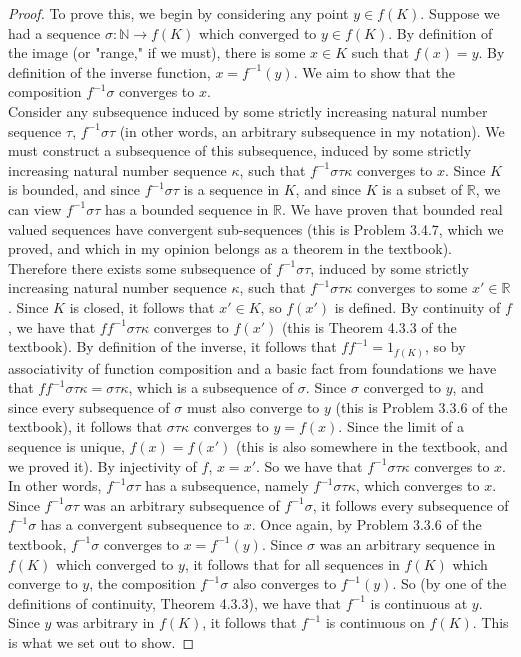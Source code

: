 \documentclass[11pt]{article}
\newcommand{\R}{\mathbb{R}}
\newcommand{\N}{\mathbb{N}}
\newcommand{\inv}[1]{{#1}^{-1}}
\theoremstyle{definition}
\begin{document}
\begin{proof}
To prove this, we begin by considering any point $y\in f(K)$. Suppose we had a sequence $\sigma:\N\to f(K)$ which converged to $y\in f(K)$. By definition of the image (or "range," if we must), there is some $x\in K$ such that $f(x) = y$. By definition of the inverse function, $x = \inv{f}(y)$. We aim to show that the composition $\inv{f}\sigma$ converges to $x$. \\

Consider any subsequence induced by some strictly increasing natural number sequence $\tau$, $\inv{f}\sigma\tau$ (in other words, an arbitrary subsequence in my notation). We must construct a subsequence of this subsequence, induced by some strictly increasing natural number sequence $\kappa$, such that $\inv{f}\sigma\tau\kappa$ converges to $x$. Since $K$ is bounded, and since $\inv{f}\sigma\tau$ is a sequence in $K$, and since $K$ is a subset of $\R$, we can view $\inv{f}\sigma\tau$ has a bounded sequence in $\R$. We have proven that bounded real valued sequences have convergent sub-sequences (this is Problem 3.4.7, which we proved, and which in my opinion belongs as a theorem in the textbook). Therefore there exists some subsequence of $\inv{f}\sigma\tau$, induced by some strictly increasing natural number sequence $\kappa$, such that $\inv{f}\sigma\tau\kappa$ converges to some $x'\in \R$. Since $K$ is closed, it follows that $x'\in K$, so $f(x')$ is defined. By continuity of $f$, we have that $f\inv{f}\sigma\tau\kappa$ converges to $f(x')$ (this is Theorem 4.3.3 of the textbook). By definition of the inverse, it follows that $f\inv{f} = 1_{f(K)}$, so by associativity of function composition and a basic fact from foundations we have that $f\inv{f}\sigma\tau\kappa = \sigma\tau\kappa$, which is a subsequence of $\sigma$. Since $\sigma$ converged to $y$, and since every subsequence of $\sigma$ must also converge to $y$ (this is Problem 3.3.6 of the textbook), it follows that $\sigma\tau\kappa$ converges to $y = f(x)$. Since the limit of a sequence is unique, $f(x) = f(x')$ (this is also somewhere in the textbook, and we proved it). By injectivity of $f$, $x = x'$. So we have that $\inv{f}\sigma\tau\kappa$ converges to $x$. In other words, $\inv{f}\sigma\tau$ has a subsequence, namely $\inv{f}\sigma\tau\kappa$, which converges to $x$. Since $\inv{f}\sigma\tau$ was an arbitrary subsequence of $ \inv{f}\sigma $, it follows every subsequence of $\inv{f}\sigma$ has a convergent subsequence to $x$. Once again, by Problem 3.3.6 of the textbook, $ \inv{f}\sigma $ converges to $x = \inv{f}(y)$. Since $\sigma$ was an arbitrary sequence in $f(K)$ which converged to $y$, it follows that for all sequences in $f(K)$ which converge to $y$, the composition $\inv{f}\sigma$ also converges to $\inv{f}(y)$. So (by one of the definitions of continuity, Theorem 4.3.3), we have that $\inv{f}$ is continuous at $y$. Since $y$ was arbitrary in $f(K)$, it follows that $\inv{f}$ is continuous on $f(K)$. This is what we set out to show.
\end{proof}
\end{document}

